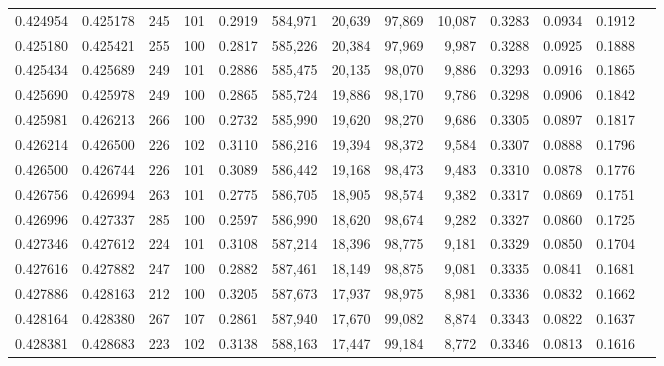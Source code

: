\begin{tabular}{rrrrrrrrrrrrr}
0.424954 & 0.425178 &   245 & 101 &                                     0.2919 & 584,971 &  20,639 &  97,869 &  10,087 & 0.3283 & 0.0934 & 0.1912 \\
0.425180 & 0.425421 &   255 & 100 &                                     0.2817 & 585,226 &  20,384 &  97,969 &   9,987 & 0.3288 & 0.0925 & 0.1888 \\
0.425434 & 0.425689 &   249 & 101 &                                     0.2886 & 585,475 &  20,135 &  98,070 &   9,886 & 0.3293 & 0.0916 & 0.1865 \\
0.425690 & 0.425978 &   249 & 100 &                                     0.2865 & 585,724 &  19,886 &  98,170 &   9,786 & 0.3298 & 0.0906 & 0.1842 \\
0.425981 & 0.426213 &   266 & 100 &                                     0.2732 & 585,990 &  19,620 &  98,270 &   9,686 & 0.3305 & 0.0897 & 0.1817 \\
0.426214 & 0.426500 &   226 & 102 &                                     0.3110 & 586,216 &  19,394 &  98,372 &   9,584 & 0.3307 & 0.0888 & 0.1796 \\
0.426500 & 0.426744 &   226 & 101 &                                     0.3089 & 586,442 &  19,168 &  98,473 &   9,483 & 0.3310 & 0.0878 & 0.1776 \\
0.426756 & 0.426994 &   263 & 101 &                                     0.2775 & 586,705 &  18,905 &  98,574 &   9,382 & 0.3317 & 0.0869 & 0.1751 \\
0.426996 & 0.427337 &   285 & 100 &                                     0.2597 & 586,990 &  18,620 &  98,674 &   9,282 & 0.3327 & 0.0860 & 0.1725 \\
0.427346 & 0.427612 &   224 & 101 &                                     0.3108 & 587,214 &  18,396 &  98,775 &   9,181 & 0.3329 & 0.0850 & 0.1704 \\
0.427616 & 0.427882 &   247 & 100 &                                     0.2882 & 587,461 &  18,149 &  98,875 &   9,081 & 0.3335 & 0.0841 & 0.1681 \\
0.427886 & 0.428163 &   212 & 100 &                                     0.3205 & 587,673 &  17,937 &  98,975 &   8,981 & 0.3336 & 0.0832 & 0.1662 \\
0.428164 & 0.428380 &   267 & 107 &                                     0.2861 & 587,940 &  17,670 &  99,082 &   8,874 & 0.3343 & 0.0822 & 0.1637 \\
0.428381 & 0.428683 &   223 & 102 &                                     0.3138 & 588,163 &  17,447 &  99,184 &   8,772 & 0.3346 & 0.0813 & 0.1616 \\

\end{tabular}
